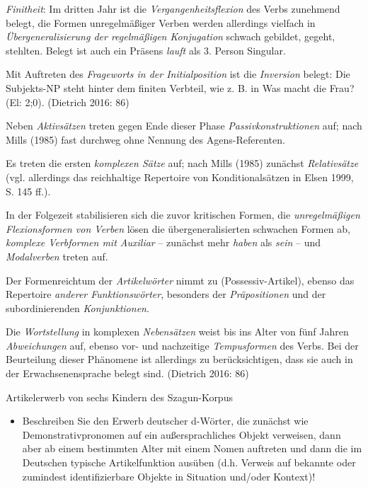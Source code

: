 \documentclass[
  letterpaper,
]{scrbook}
\providecommand{\tightlist}{%
  \setlength{\itemsep}{0pt}\setlength{\parskip}{0pt}}\usepackage{longtable,booktabs,array}
\begin{document}
\emph{Finitheit}: Im dritten Jahr ist die \emph{Vergangenheitsflexion}
des Verbs zunehmend belegt, die Formen unregelmäßiger Verben werden
allerdings vielfach in \emph{Übergeneralisierung der regelmäßigen
Konjugation} schwach gebildet, gegeht, stehlten. Belegt ist auch ein
Präsens \emph{lauft} als 3. Person Singular.

Mit Auftreten des \emph{Frageworts in der Initialposition} ist die
\emph{Inversion} belegt: Die Subjekts-NP steht hinter dem finiten
Verbteil, wie z. B. in Was macht die Frau? (El: 2;0). (Dietrich 2016:
86)

Neben \emph{Aktivsätzen} treten gegen Ende dieser Phase
\emph{Passivkonstruktionen} auf; nach Mills (1985) fast durchweg ohne
Nennung des Agens-Referenten.

Es treten die ersten \emph{komplexen Sätze} auf; nach Mills (1985)
zunächst \emph{Relativsätze} (vgl. allerdings das reichhaltige
Repertoire von Konditionalsätzen in Elsen 1999, S. 145 ff.).

In der Folgezeit stabilisieren sich die zuvor kritischen Formen, die
\emph{unregelmäßigen Flexionsformen von Verben} lösen die
übergeneralisierten schwachen Formen ab, \emph{komplexe Verbformen mit
Auxiliar} -- zunächst mehr \emph{haben} als \emph{sein} -- und
\emph{Modalverben} treten auf.

Der Formenreichtum der \emph{Artikelwörter} nimmt zu
(Possessiv-Artikel), ebenso das Repertoire \emph{anderer
Funktionswörter}, besonders der \emph{Präpositionen} und der
subordinierenden \emph{Konjunktionen}.

Die \emph{Wortstellung} in komplexen \emph{Nebensätzen} weist bis ins
Alter von fünf Jahren \emph{Abweichungen} auf, ebenso vor- und
nachzeitige \emph{Tempusformen} des Verbs. Bei der Beurteilung dieser
Phänomene ist allerdings zu berücksichtigen, dass sie auch in der
Erwachsenensprache belegt sind. (Dietrich 2016: 86)

Artikelerwerb von sechs Kindern des Szagun-Korpus

\begin{itemize}
\tightlist
\item
  Beschreiben Sie den Erwerb deutscher d-Wörter, die zunächst wie
  Demonstrativpronomen auf ein außersprachliches Objekt verweisen, dann
  aber ab einem bestimmten Alter mit einem Nomen auftreten und dann die
  im Deutschen typische Artikelfunktion ausüben (d.h. Verweis auf
  bekannte oder zumindest identifizierbare Objekte in Situation und/oder
  Kontext)!
\end{itemize}
\end{document}
